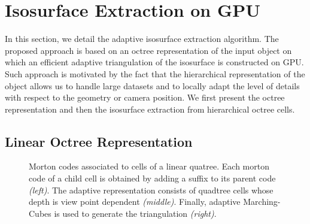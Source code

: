 \documentclass{llncs}
\begin{document}
\section{Isosurface Extraction on GPU}
\label{sec:isos-extr-gpu}

In this section, we detail the adaptive isosurface extraction
algorithm. The proposed approach is based on an octree representation
of the input object on which an efficient adaptive triangulation
of the isosurface is constructed on GPU. Such approach is motivated by
the fact that the hierarchical representation of the object allows us
to handle large datasets and to locally adapt the level of details
with respect to the geometry or camera position. We first present the
octree representation and then the isosurface extraction from
hierarchical octree cells.

\subsection{Linear Octree Representation}

\begin{figure}[!htbp]
  \begin{center}
  \end{center}
\caption{Morton codes associated to cells of a linear quatree. Each
   morton code of a child cell is obtained by adding a suffix to its
  parent code \emph{(left)}. The adaptive representation consists of
  quadtree cells whose depth is view point dependent
  \emph{(middle)}. Finally, adaptive Marching-Cubes is used to
  generate the triangulation \emph{(right)}.}
\label{fig_quadtree_partitionning}
\end{figure}
\end{document}
